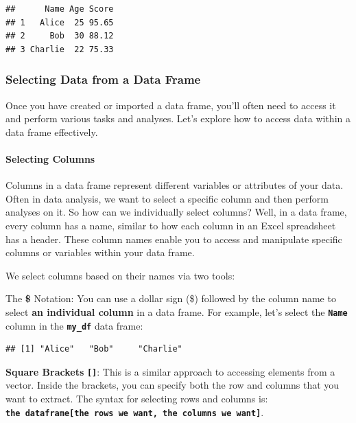 \documentclass[
]{book}
\newenvironment{Shaded}{\begin{snugshade}}{\end{snugshade}}
\newcommand{\NormalTok}[1]{#1}
\newcommand{\SpecialCharTok}[1]{\textcolor[rgb]{0.81,0.36,0.00}{\textbf{#1}}}
\begin{document}
\begin{verbatim}
##      Name Age Score
## 1   Alice  25 95.65
## 2     Bob  30 88.12
## 3 Charlie  22 75.33
\end{verbatim}

\hypertarget{selecting-data-from-a-data-frame}{%
\subsubsection{Selecting Data from a Data Frame}\label{selecting-data-from-a-data-frame}}

Once you have created or imported a data frame, you'll often need to access it and perform various tasks and analyses. Let's explore how to access data within a data frame effectively.

\hypertarget{selecting-columns}{%
\paragraph{Selecting Columns}\label{selecting-columns}}

Columns in a data frame represent different variables or attributes of your data. Often in data analysis, we want to select a specific column and then perform analyses on it. So how can we individually select columns? Well, in a data frame, every column has a name, similar to how each column in an Excel spreadsheet has a header. These column names enable you to access and manipulate specific columns or variables within your data frame.

We select columns based on their names via two tools:

The \textbf{\$} Notation: You can use a dollar sign (\$) followed by the column name to select \textbf{an individual column} in a data frame. For example, let's select the \textbf{\texttt{Name}} column in the \textbf{\texttt{my\_df}} data frame:

\begin{Shaded}
\end{Shaded}

\begin{verbatim}
## [1] "Alice"   "Bob"     "Charlie"
\end{verbatim}

\textbf{Square Brackets} \textbf{\texttt{{[}{]}}}: This is a similar approach to accessing elements from a vector. Inside the brackets, you can specify both the row and columns that you want to extract. The syntax for selecting rows and columns is: \textbf{\texttt{the\ dataframe{[}the\ rows\ we\ want,\ the\ columns\ we\ want{]}}}.
\end{document}
